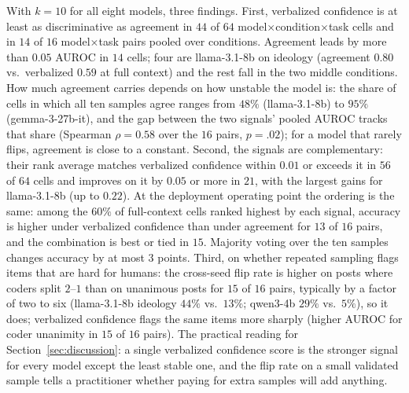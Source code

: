 \documentclass[11pt]{article}
\begin{document}
With $k{=}10$ for all eight models, three findings. First, verbalized confidence is at least as discriminative as agreement in $44$ of $64$ model$\times$condition$\times$task cells and in $14$ of $16$ model$\times$task pairs pooled over conditions. Agreement leads by more than $0.05$ AUROC in $14$ cells; four are llama-3.1-8b on ideology (agreement $0.80$ vs.\ verbalized $0.59$ at full context) and the rest fall in the two middle conditions. How much agreement carries depends on how unstable the model is: the share of cells in which all ten samples agree ranges from $48\%$ (llama-3.1-8b) to $95\%$ (gemma-3-27b-it), and the gap between the two signals' pooled AUROC tracks that share (Spearman $\rho{=}0.58$ over the $16$ pairs, $p{=}.02$); for a model that rarely flips, agreement is close to a constant. Second, the signals are complementary: their rank average matches verbalized confidence within $0.01$ or exceeds it in $56$ of $64$ cells and improves on it by $0.05$ or more in $21$, with the largest gains for llama-3.1-8b (up to $0.22$). At the deployment operating point the ordering is the same: among the $60\%$ of full-context cells ranked highest by each signal, accuracy is higher under verbalized confidence than under agreement for $13$ of $16$ pairs, and the combination is best or tied in $15$. Majority voting over the ten samples changes accuracy by at most $3$ points. Third, on whether repeated sampling flags items that are hard for humans: the cross-seed flip rate is higher on posts where coders split $2$--$1$ than on unanimous posts for $15$ of $16$ pairs, typically by a factor of two to six (llama-3.1-8b ideology $44\%$ vs.\ $13\%$; qwen3-4b $29\%$ vs.\ $5\%$), so it does; verbalized confidence flags the same items more sharply (higher AUROC for coder unanimity in $15$ of $16$ pairs). The practical reading for Section~\ref{sec:discussion}: a single verbalized confidence score is the stronger signal for every model except the least stable one, and the flip rate on a small validated sample tells a practitioner whether paying for extra samples will add anything.
\end{document}

